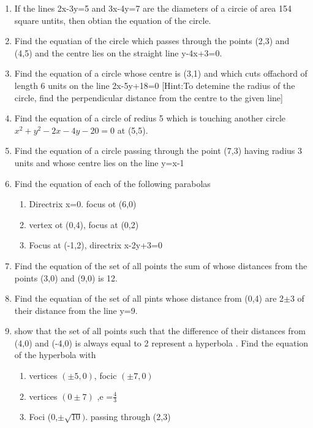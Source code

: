 \documentclass[12pt]{article}
\begin{document}
\begin{enumerate}
\item If the lines 2x-3y=5 and 3x-4y=7 are the diameters of a circie of area 154 square untits, then obtian the equation of the circle.
\item Find the equatian of the circle which passes through the points (2,3) and (4,5) and the centre lies on the straight line y-4x+3=0.
\item Find the equation of a circle whose centre is (3,1) and which cuts offachord of length  6 units on the  line 2x-5y+18=0
[Hint:To detemine the radius of the circle, find the perpendicular distance from the centre to the given line]
\item Find the equation of a circle of redius 5 which is touching another circle $x^2+y^2-2x-4y-20=0$ at (5,5).
\item Find the equation of a circle passing through the point (7,3) having radius 3 units and whose centre lies on the line y=x-1
\item Find the equation of each of the following parabolas
\begin{enumerate}
\item  Directrix x=0. focus ot (6,0)
\item  vertex  ot (0,4), focus at (0,2)
\item  Focus at (-1,2), directrix x-2y+3=0
\end{enumerate}
\item Find the equation of the set of all points the sum of whose distances  from the points (3,0) and (9,0) is 12.
\item Find the equatian of the set of all pints whose distance from (0,4) are 2$\pm$3 of their distance from the line y=9.
\item show that the set of all points such that the difference of their distances from (4,0) and (-4,0) is always equal to 2 represent a hyperbola .
 Find the equation of the hyperbola with
 \begin{enumerate}
	 \item  vertices $(\pm5,0)$, focic $(\pm 7,0)$
	 \item vertices $(0\pm7)$ ,e =$\frac{4}{3}$ 
	 \item  Foci (0,$\pm\sqrt{10})$. passing through (2,3)
\end{enumerate}

\end{enumerate}
\end{document}
